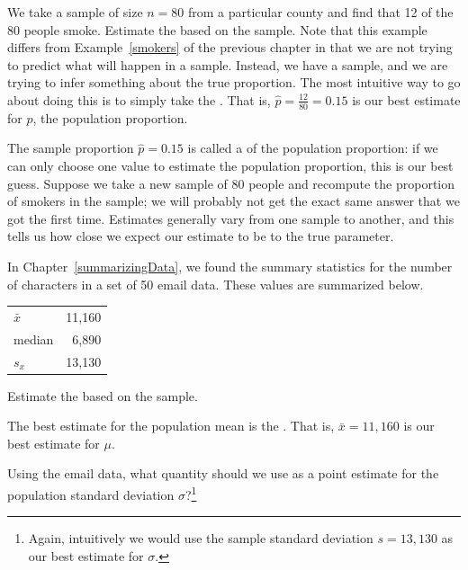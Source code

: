\begin{example}{We take a sample of size $n=80$ from a particular county and find that 12 of the 80 people smoke. Estimate the  based on the sample. Note that this example differs from Example~\ref{smokers} of the previous chapter in that we are not trying to predict what will happen in a sample. Instead, we have a sample, and we are trying to infer something about the true proportion.} The most intuitive way to go about doing this is to simply take the . That is,
$\hat{p} = \frac{12}{80} = 0.15$ is our best estimate for $p$, the population proportion.
\end{example}

The sample proportion $\hat{p} = 0.15$ is called a  of the population proportion: if we can only choose one value to estimate the population proportion, this is our best guess. Suppose we take a new sample of 80 people and recompute the proportion of smokers in the sample; we will probably not get the exact same answer that we got the first time. Estimates generally vary from one sample to another, and this  tells us how close we expect our estimate to be to the true parameter.

\begin{example}{
In Chapter~\ref{summarizingData}, we found the summary statistics for the number of characters in a set of 50 email data. These values are summarized below.

\begin{tabular}{l r }
$\bar{x}$ & 11,160 \\
median & 6,890 \\
$s_x$ & 13,130
\end{tabular}

Estimate the  based on the sample.}The best estimate for the population mean is the . That is,
$\bar{x} = 11,160$ is our best estimate for $\mu$.
\end{example}

\begin{exercise}Using the email data, what quantity should we use as a point estimate for the population standard deviation $\sigma$?\footnote{Again, intuitively we would use the sample standard deviation $s = 13,130$ as our best estimate for $\sigma$.}
\end{exercise}

%

